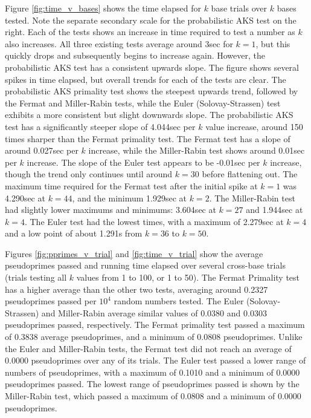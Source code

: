 \documentclass{article}
\begin{document}
Figure \ref{fig:time_v_bases} shows the time elapsed for $k$ base trials over $k$ bases tested. Note the separate secondary scale for the probabilistic AKS test on the right. Each of the tests shows an increase in time required to test a number as $k$ also increases. All three existing tests average around 3sec for $k = 1$, but this quickly drops and subsequently begins to increase again. However, the probabilistic AKS test has a consistent upwards slope. The figure shows several spikes in time elapsed, but overall trends for each of the tests are clear. The probabilistic AKS primality test shows the steepest upwards trend, followed by the Fermat and Miller-Rabin tests, while the Euler (Solovay-Strassen) test exhibits a more consistent but slight downwards slope. The probabilistic AKS test has a significantly steeper slope of 4.044sec per $k$ value increase, around 150 times sharper than the Fermat primality test. The Fermat test has a slope of around 0.027sec per $k$ increase, while the Miller-Rabin test shows around 0.01sec per $k$ increase. The slope of the Euler test appears to be -0.01sec per $k$ increase, though the trend only continues until around $k=30$ before flattening out. The maximum time required for the Fermat test after the initial spike at $k=1$ was 4.290sec at $k=44$, and the minimum 1.929sec at $k=2$. The Miller-Rabin test had slightly lower maximums and minimums: 3.604sec at $k=27$ and 1.944sec at $k=4$. The Euler test had the lowest times, with a maximum of 2.279sec at $k=4$ and a low point of about 1.291s from $k=36$ to $k=50$.

Figures \ref{fig:pprimes_v_trial} and \ref{fig:time_v_trial} show the average pseudoprimes passed and running time elapsed over several cross-base trials (trials testing all $k$ values from 1 to 100, or 1 to 50). The Fermat Primality test has a higher average than the other two tests, averaging around 0.2327 pseudoprimes passed per $10^4$ random numbers tested. The Euler (Solovay-Strassen) and Miller-Rabin average similar values of 0.0380 and 0.0303 pseudoprimes passed, respectively. The Fermat primality test passed a maximum of 0.3838 average pseudoprimes, and a minimum of 0.0808 pseudoprimes. Unlike the Euler and Miller-Rabin tests, the Fermat test did not reach an average of 0.0000 pseudoprimes over any of its trials. The Euler test passed a lower range of numbers of pseudoprimes, with a maximum of 0.1010 and a minimum of 0.0000 pseudoprimes passed. The lowest range of pseudoprimes passed is shown by the Miller-Rabin test, which passed a maximum of 0.0808 and a minimum of 0.0000 pseudoprimes.
\end{document}
